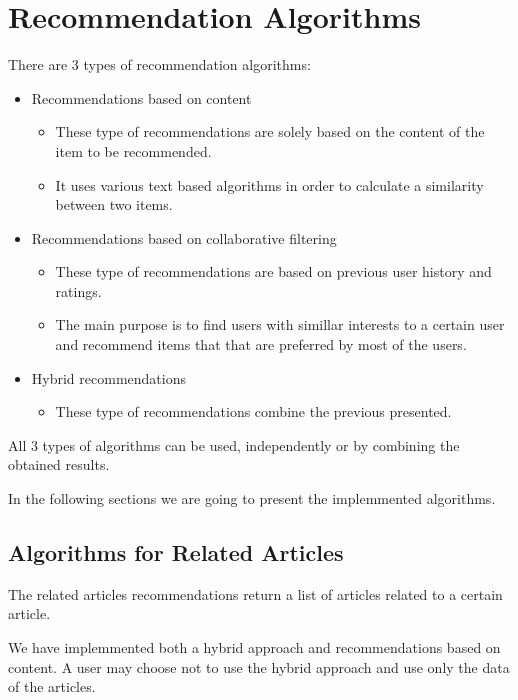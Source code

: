 \chapter{Recommendation Algorithms}
\label{chapter:recommendation-system-algorithms}
There are 3 types of recommendation algorithms: 
\begin{itemize}
	\item Recommendations based on content
	\begin{itemize}
		\item These type of recommendations are solely based on the content of the item to be recommended.
		\item It uses various text based algorithms in order to calculate a similarity between two items.
	\end{itemize}
	\item Recommendations based on collaborative filtering
	\begin{itemize}
		\item These type of recommendations are based on previous user history and ratings.
		\item The main purpose is to find users with simillar interests to a certain user and recommend items that that are preferred by most of the users.
	\end{itemize}
	\item Hybrid recommendations
	\begin{itemize}
		\item These type of recommendations combine the previous presented.
	\end{itemize}
\end{itemize}
All 3 types of algorithms can be used, independently or by combining the obtained results.

In the following sections we are going to present the implemmented algorithms.


\section{Algorithms for Related Articles}
\label{sec:algorithms-for-related-articles}
The related articles recommendations return a list of articles related to a certain article.

We have implemmented both a hybrid approach and recommendations based on content.
A user may choose not to use the hybrid approach and use only the data of the articles.

